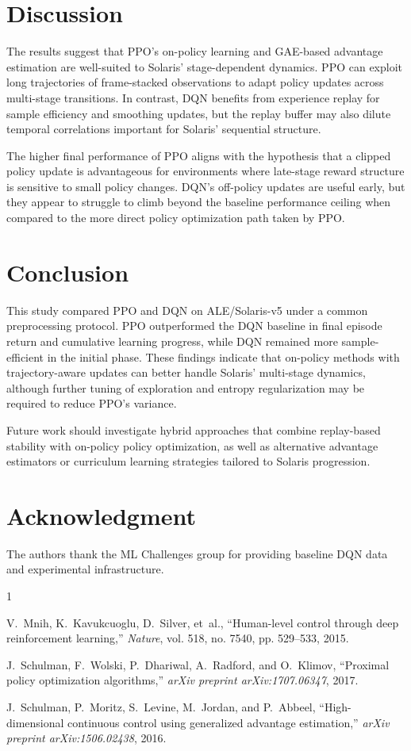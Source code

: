 \documentclass[conference]{IEEEtran}
\begin{document}
\section{Discussion}
The results suggest that PPO's on-policy learning and GAE-based advantage estimation are well-suited to Solaris' stage-dependent dynamics. PPO can exploit long trajectories of frame-stacked observations to adapt policy updates across multi-stage transitions. In contrast, DQN benefits from experience replay for sample efficiency and smoothing updates, but the replay buffer may also dilute temporal correlations important for Solaris' sequential structure.

The higher final performance of PPO aligns with the hypothesis that a clipped policy update is advantageous for environments where late-stage reward structure is sensitive to small policy changes. DQN's off-policy updates are useful early, but they appear to struggle to climb beyond the baseline performance ceiling when compared to the more direct policy optimization path taken by PPO.

\section{Conclusion}
This study compared PPO and DQN on ALE/Solaris-v5 under a common preprocessing protocol. PPO outperformed the DQN baseline in final episode return and cumulative learning progress, while DQN remained more sample-efficient in the initial phase. These findings indicate that on-policy methods with trajectory-aware updates can better handle Solaris' multi-stage dynamics, although further tuning of exploration and entropy regularization may be required to reduce PPO's variance.

Future work should investigate hybrid approaches that combine replay-based stability with on-policy policy optimization, as well as alternative advantage estimators or curriculum learning strategies tailored to Solaris progression.

\section*{Acknowledgment}
The authors thank the ML Challenges group for providing baseline DQN data and experimental infrastructure.


\begin{thebibliography}{1}

V.~Mnih, K.~Kavukcuoglu, D.~Silver, et~al., ``Human-level control through deep reinforcement learning,'' \emph{Nature}, vol. 518, no. 7540, pp. 529--533, 2015.

J.~Schulman, F.~Wolski, P.~Dhariwal, A.~Radford, and O.~Klimov, ``Proximal policy optimization algorithms,'' \emph{arXiv preprint arXiv:1707.06347}, 2017.

J.~Schulman, P.~Moritz, S.~Levine, M.~Jordan, and P.~Abbeel, ``High-dimensional continuous control using generalized advantage estimation,'' \emph{arXiv preprint arXiv:1506.02438}, 2016.

\end{thebibliography}
\end{document}

